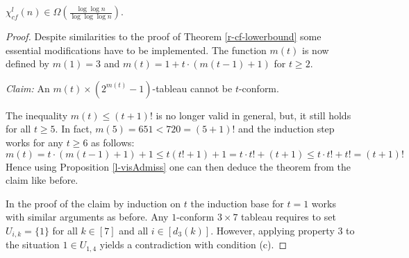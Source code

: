 \documentclass[a4paper,USenglish,numberwithinsect]{lipics}
\theoremstyle{plain}
\begin{document}
\begin{theorem}
\label{l-cf-lowerbound}
$\chi_{cf}^l (n) \in
\Omega\left(\frac{\log{\log{n}}}{\log{\log{\log{n}}}}\right)$.
\end{theorem}
\begin{proof}
Despite similarities to the proof of Theorem
\ref{r-cf-lowerbound}
some essential modifications have to be implemented.
The function $m(t)$  is now
defined by $m(1)=3$ and
$m(t)=1+t \cdot (m(t-1)+1)$ for
 $t \geq 2$.

\noindent
{\em Claim:} An $m(t) \times (2^{m(t)}-1)$-tableau cannot be $t$-conform.
 

\noindent
The inequality $m(t) \leq
(t+1)!$ is no longer valid in general,
but, it still holds for all $t \geq 5$. In fact, $m(5)=651<720=(5+1)!$
and the  induction
step works for any $t \geq 6$ as follows:
\\
$m(t) = t\cdot(m(t-1)+1)+1 \leq t(t!+1)+1 = t \cdot t! +(t+1) \leq t \cdot t!
+t!=(t+1)!$
\\
Hence using Proposition \ref{l-visAdmiss} one can then deduce the theorem
from the claim like before.

\noindent
In the  proof of the claim  by induction on $t$  the induction base for
$t=1$ works
with similar arguments as before. Any $1$-conform $3 \times 7$ tableau
requires to set $U_{i,k}=\{1\}$ for all $k \in [7]$ and all $i \in
[d_3(k)]$.
However, applying property 3 to the situation $1 \in U_{1,4}$ 
yields a contradiction with condition (c).


\end{proof}
\end{document}
